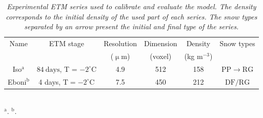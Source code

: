 \documentclass[draft,ms]{agujournal2019}
\begin{document}
\begin{table}
\caption{\textit{Experimental ETM series used to calibrate and evaluate the model. The density corresponds to the initial density of the used part of each series. The snow types separated by an arrow present the initial and final type of the series.}}
\begin{tabular}{|c|c|c|c|c|c|}
\hline Name & ETM stage & Resolution & Dimension & Density & Snow types \\
 &  & ($\upmu$m) &(voxel) & (kg m$^{-3}$) &  \\
\hline 
Iso$^\mathrm{a}$ & $84\ \mathrm{days}$, T = $-2^{\circ} \mathrm{C}$ & 4.9 & 512 & 158 & \small{$\mathrm{PP} \rightarrow \mathrm{RG}$}\\
Eboni$^\mathrm{b}$ & 4 days, $\mathrm{T}=-2^{\circ} \mathrm{C}$ & 7.5 & 450 & 212 & \small{$\mathrm{DF/RG}$}\\
\hline
\end{tabular}
\label{tab:series_exp}\\
$^\mathrm{a}$\protect{}. $^\mathrm{b}$\protect{}.
\end{table}
\end{document}
